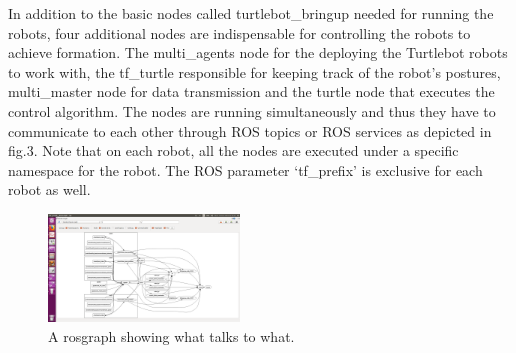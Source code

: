 \documentclass[journal]{IEEEtran}
\begin{document}
In addition to the basic nodes called turtlebot{\_}bringup needed for running the robots, four additional nodes are indispensable for controlling the robots to achieve formation. 
The multi{\_}agents node for the deploying the Turtlebot robots to work with, the tf{\_}turtle responsible for keeping track of the robot's postures, multi{\_}master node for data transmission and the turtle node that executes the control algorithm. The nodes are running simultaneously and thus they have to communicate to each other through ROS topics or ROS services as depicted in fig.3. Note that on each robot, all the nodes are executed under a specific namespace for the robot. The ROS parameter ‘tf{\_}prefix’ is exclusive for each robot as well.
\begin{figure}[!h]
\begin{center}
\includegraphics[width=2in]{4.png}
\caption{A rosgraph showing what talks to what.}
\end{center}
\label{fig2:mypicture2}
\end{figure}
\end{document}

